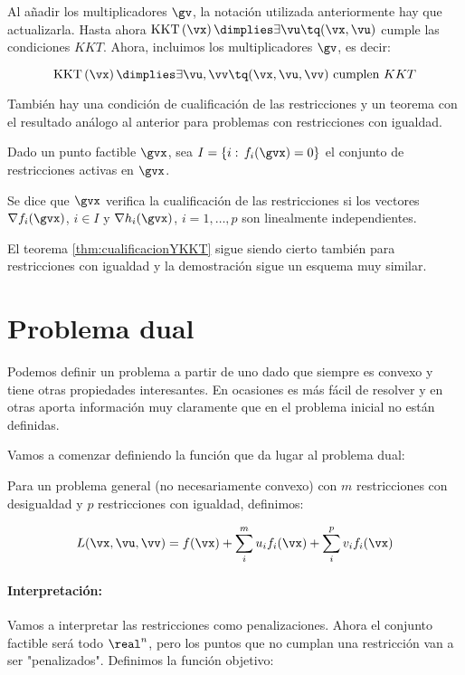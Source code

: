 \obs Al añadir los multiplicadores $\gv$, la notación utilizada anteriormente hay que actualizarla.
%
Hasta ahora $\KKT{\vx} \dimplies \exists \vu \tq (\vx,\vu)$ cumple las condiciones $KKT$.
%
Ahora, incluimos los multiplicadores $\gv$, es decir:

\[
	\KKT{\vx} \dimplies \exists \vu,\vv \tq (\vx,\vu,\vv) \text{ cumplen } KKT
\]

También hay una condición de cualificación de las restricciones y un teorema con el resultado análogo al anterior para problemas con restricciones con igualdad.


\begin{defn} 
Dado un punto factible $\gvx$, sea $I=\{i:\, f_i(\gvx)=0\}$ el conjunto de restricciones activas en $\gvx$.

Se dice que $\gvx$ verifica la cualificación de las restricciones si  los vectores $\nabla f_i(\gvx)$, $i\in I$ y $\nabla h_i(\gvx)$, $i=1,\ldots,p$ son linealmente independientes.
\end{defn}


El teorema \ref{thm:cualificacionYKKT} sigue siendo cierto también para restricciones con igualdad y la demostración sigue un esquema muy similar.


\section{Problema dual}

Podemos definir un problema a partir de uno dado que siempre es convexo y tiene otras propiedades interesantes. En ocasiones es más fácil de resolver y en otras aporta información muy claramente que en el problema inicial no están definidas. 

Vamos a comenzar definiendo la función que da lugar al problema dual:

\begin{defn}
Para un problema general (no necesariamente convexo) con $m$ restricciones con desigualdad y $p$ restricciones con igualdad, definimos:

\[
	L(\vx,\vu,\vv) = f(\vx) + \sum_i^m u_if_i(\vx) + \sum_i^p v_if_i(\vx)
\]
\end{defn}

\paragraph{Interpretación:} Vamos a interpretar las restricciones como penalizaciones. Ahora el conjunto factible será todo $\real^n$, pero los puntos que no cumplan una restricción van a ser "penalizados". Definimos la función objetivo:

